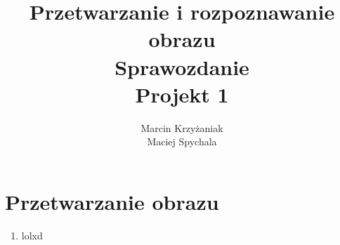 \documentclass[a4paper,11pt]{article}
\author{Marcin Krzyżaniak  \\ Maciej Spychala}
\title{Przetwarzanie i rozpoznawanie obrazu\\ 
\large{{\bf Sprawozdanie} \\ Projekt 1}}
\begin{document}
\maketitle 

\section{Przetwarzanie obrazu}
\begin{enumerate}
\item lolxd
\end{enumerate}
\bigskip
\noindent
\end{document}
